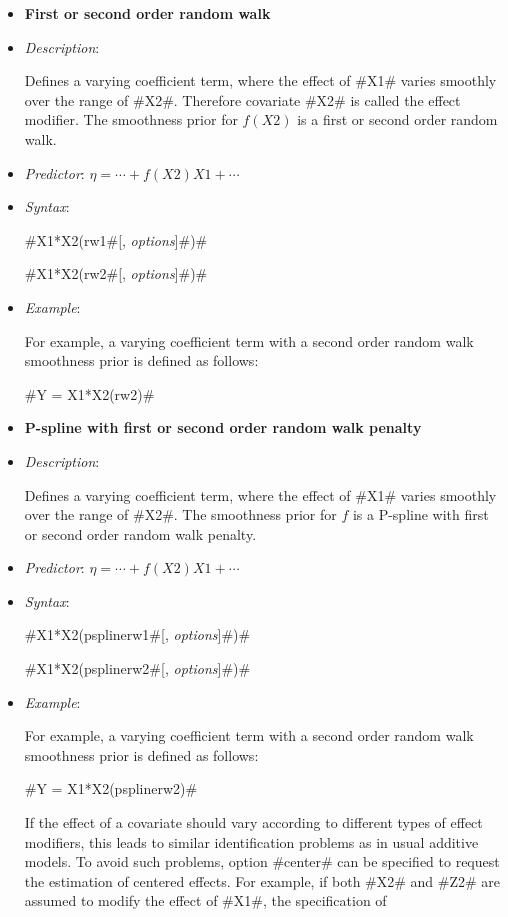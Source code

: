 \begin{itemize}
\item[]{\bf\sffamily First or second order random walk}

\item[] {\em Description}:

Defines a varying coefficient term, where the effect of #X1#
varies smoothly over the range of #X2#. Therefore covariate #X2#
is called the effect modifier. The smoothness prior for $f(X2)$ is
a first or second order random walk.
\item[] {\em Predictor}:
$\eta= \cdots + f(X2)X1 + \cdots$ \item[] {\em Syntax}:

#X1*X2(rw1#[, {\em options}]#)#

#X1*X2(rw2#[, {\em options}]#)#
\item[] {\em Example}:

For example, a varying coefficient term with a second order random
walk smoothness prior is defined as follows:

#Y = X1*X2(rw2)#

\item[]{\bf\sffamily P-spline with first or second order random
walk penalty}

\item[] {\em Description}:

Defines a varying coefficient term, where the effect of #X1#
varies smoothly over the range of #X2#. The smoothness prior for
$f$ is a P-spline with first or second order random walk penalty.
\item[] {\em Predictor}: $\eta= \cdots + f(X2)X1 + \cdots$ \item[]
{\em Syntax}:

#X1*X2(psplinerw1#[, {\em options}]#)#

#X1*X2(psplinerw2#[, {\em options}]#)#
\item[] {\em Example}:

For example, a varying coefficient term with a second order random
walk smoothness prior is defined as follows:

#Y = X1*X2(psplinerw2)#

If the effect of a covariate should vary according to different
types of effect modifiers, this leads to similar identification
problems as in usual additive models. To avoid such problems,
option #center# can be specified to request the estimation of
centered effects. For example, if both #X2# and #Z2# are assumed
to modify the effect of #X1#, the specification of


\end{itemize}
